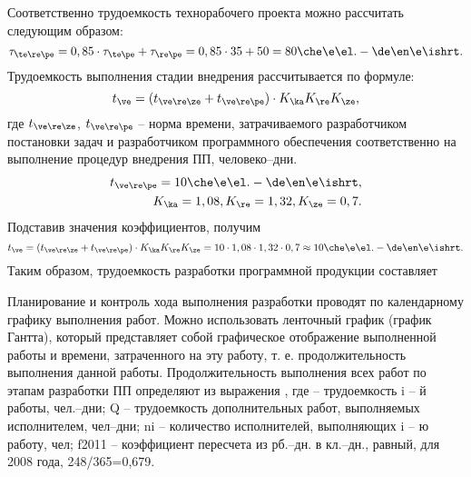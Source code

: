 Соответственно трудоемкость технорабочего проекта можно рассчитать следующим образом:
\begin{equation*}
	\tau_{\te\re\pe}=0,85 \cdot \tau_{\te\pe} + \tau_{\re\pe} = 0,85 \cdot 35 + 50 = 80 \che\e\el.-\de\en\e\ishrt.
\end{equation*}
Трудоемкость выполнения стадии внедрения рассчитывается по формуле:
\begin{equation*}
	t_{\ve} = (t_{\ve\re\ze} + t_{\ve\re\pe}) \cdot K_{\ka} K_{\re} K_{\ze},
\end{equation*}
где $t_{\ve\re\ze}$, $t_{\ve\re\pe}$ -- норма времени, затрачиваемого разработчиком постановки задач и разработчиком программного обеспечения соответственно на выполнение процедур внедрения ПП, человеко–дни. 
\begin{eqnarray*}
	t_{\ve\re\pe} = 10 \che\e\el.-\de\en\e\ishrt, \\
	K_{\ka} = 1,08, K_{\re} = 1,32, K_{\ze} = 0,7.
\end{eqnarray*}
Подставив значения коэффициентов, получим
\begin{equation*}
	t_{\ve} = (t_{\ve\re\ze} + t_{\ve\re\pe}) \cdot K_{\ka} K_{\re} K_{\ze} = 10\cdot1,08\cdot1,32\cdot0,7 \approx 10 \che\e\el.-\de\en\e\ishrt.
\end{equation*}
Таким образом, трудоемкость разработки программной продукции   составляет
 
Планирование и контроль хода выполнения разработки проводят по календарному графику выполнения работ. Можно использовать ленточный график (график Гантта), который представляет собой графическое отображение выполненной работы и времени, затраченного на эту работу, т. е. продолжительность выполнения данной работы.
Продолжительность выполнения всех работ по этапам разработки ПП определяют из выражения
 ,
где  – трудоемкость i – й работы, чел.–дни; 
Q – трудоемкость дополнительных работ, выполняемых исполнителем, чел–дни; 
ni – количество исполнителей, выполняющих i – ю работу, чел;
f2011 – коэффициент пересчета из рб.–дн. в кл.–дн., равный, для 2008 года, 248/365=0,679.
